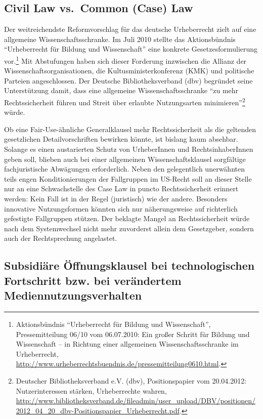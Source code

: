 \documentclass[output=paper]{langscibook}
\begin{document}
\hypertarget{civil-law-vs.-common-case-law}{%
\subsection{Civil Law vs.~Common (Case)
Law}\label{civil-law-vs.-common-case-law}}

Der weitreichendste Reformvorschlag für das deutsche Urheberrecht zielt
auf eine allgemeine Wissenschaftsschranke. Im Juli 2010 stellte das
Aktionsbündnis \enquote{Urheberrecht für Bildung und Wissenschaft} eine
konkrete Gesetzesformulierung vor.\footnote{Aktionsbündnis
  \enquote{Urheberrecht für Bildung und Wissenschaft}, Pressemitteilung
  06/10 vom 06.07.2010: Ein großer Schritt für Bildung und Wissenschaft
  -- in Richtung einer allgemeinen Wissenschaftsschranke im
  Urheberrecht,
  \url{http://www.urheberrechtsbuendnis.de/pressemitteilung0610.html}.}
Mit Abstufungen haben sich dieser Forderung inzwischen die Allianz der
Wissenschaftsorganisationen, die Kultusministerkonferenz (KMK) und
politische Parteien angeschlossen. Der Deutsche Bibliotheksverband (dbv)
begründet seine Unterstützung damit, dass eine allgemeine
Wissenschaftsschranke \enquote{zu mehr Rechtssicherheit führen und
Streit über erlaubte Nutzungsarten minimieren}\footnote{Deutscher
  Bibliotheksverband e.V. (dbv), Positionspapier vom 20.04.2012:
  Nutzerinteressen stärken, Urheberrechte wahren,
  \url{http://www.bibliotheksverband.de/fileadmin/user_upload/DBV/positionen/2012_04_20_dbv-Positionspapier_Urheberrecht.pdf}.}
würde.

Ob eine Fair-Use-ähnliche Generalklausel mehr Rechtssicherheit als die
geltenden gesetzlichen Detailvorschriften bewirken könnte, ist bislang
kaum absehbar. Solange es einen austarierten Schutz von UrheberInnen und
RechtsinhaberInnen geben soll, blieben auch bei einer allgemeinen
Wissenschaftsklausel sorgfältige fachjuristische Abwägungen
erforderlich. Neben den gelegentlich unerwähnten teils engen
Konditionierungen der Fallgruppen im US-Recht soll an dieser Stelle nur
an eine Schwachstelle des Case Law in puncto Rechtssicherheit erinnert
werden: Kein Fall ist in der Regel (juristisch) wie der andere.
Besonders innovative Nutzungsformen könnten sich nur näherungsweise auf
richterlich gefestigte Fallgruppen stützen. Der beklagte Mangel an
Rechtssicherheit würde nach dem Systemwechsel nicht mehr zuvorderst
allein dem Gesetzgeber, sondern auch der Rechtsprechung angelastet.

\hypertarget{subsidiuxe4re-uxf6ffnungsklausel-bei-technologischen-fortschritt-bzw.-bei-veruxe4ndertem-mediennutzungsverhalten}{%
\subsection{Subsidiäre Öffnungsklausel bei technologischen Fortschritt
bzw. bei verändertem
Mediennutzungsverhalten}\label{subsidiuxe4re-uxf6ffnungsklausel-bei-technologischen-fortschritt-bzw.-bei-veruxe4ndertem-mediennutzungsverhalten}}
\end{document}
